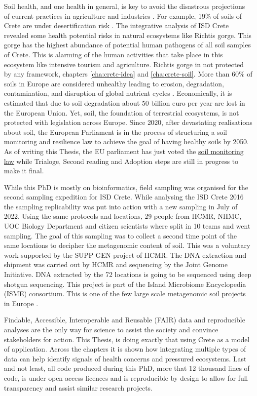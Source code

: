 Soil health,
and one health in general, is key to avoid the disastrous projections of
current practices in agriculture and industries \parencite{banerjee2023Soil}.
For example, 19\% of soils of Crete are under desertification risk \parencite{KARAMESOUTI2018266}.
The integrative analysis of ISD Crete revealed some health potential risks in 
natural ecosystems like Richtis gorge. This gorge has the highest abundance of 
potential human pathogens of all soil samples of Crete. This is alarming of 
the human activities that take place in this ecosystem like intensive tourism 
and agriculture. Richtis gorge in not protected by any framework, chapters \ref{cha:crete-idea} and \ref{cha:crete-soil}.
More than 60\% of
soils in Europe are considered unhealthy leading to erosion, degradation, contamination,
and disruption of global nutrient cycles \parencite{commission2020caring}.
Economically, it is estimated that due to soil degradation about 50 billion euro per year
are lost in the European Union. 
Yet, soil, the foundation of 
terrestrial ecosystems, is not protected with legislation across Europe.
Since 2020, after devastating realisations about soil, the European Parliament 
is in the process of structuring a soil monitoring and resilience law to achieve 
the goal of having healthy soils by 2050. As of writing this Thesis, the EU 
parliament has just voted the \href{https://www.europarl.europa.eu/thinktank/en/document/EPRS_BRI(2024)757627}{soil monitoring law}
while Trialoge, Second reading and Adoption steps are still in progress to make it final.

While this PhD is mostly on bioinformatics, field sampling was organised
for the second sampling expedition for ISD Crete.
While analysing the ISD Crete 2016 the sampling replicability was put into action with a 
new sampling in July of 2022.
Using the same protocols and locations, 29 people from HCMR, NHMC, UOC Biology
Department and citizen scientists where split in 10 teams and went sampling. 
The goal of this sampling was to collect a second time point of the same locations
to decipher the metagenomic content of soil. This was a voluntary work supported 
by the SUPP GEN project of HCMR. The DNA extraction and shipment was carried out 
by HCMR and sequencing by the Joint Genome Initiative. DNA extracted by the 72 locations 
is going to be sequenced using deep shotgun sequencing. 
This project is part of the Island Microbiome Encyclopedia (ISME) consortium.
This is one of the few large scale metagenomic soil projects in
Europe \parencite{nayfach2021a-genomic, ma2023a-genomic}.

Findable, Accessible, Interoperable and Reusable (FAIR) data and reproducible analyses
are the only way for science to assist the society and convince stakeholders for action. 
This Thesis, is doing exactly that using Crete as a model of application. Across the chapters it is shown how 
integrating multiple types of data can help identify signals of health concerns and 
pressured ecosystems. Last and not least, all code produced during this PhD, more that 12 thousand lines of code, 
is under open access licences
and is reproducible by design to allow for full transparency and assist similar research projects. 
